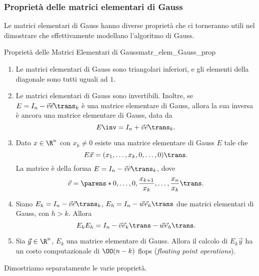 \subsubsection{Proprietà delle matrici elementari di Gauss} 
Le matrici elementari di Gauss hanno diverse proprietà che ci torneranno utili nel dimostrare che effettivamente modellano l'algoritmo di Gauss.

\begin{proposition}
    {Proprietà delle Matrici Elementari di Gauss}{matr_elem_Gauss_prop}
    \begin{enumerate}[(1)]
        \item Le matrici elementari di Gauss sono triangolari inferiori, e gli elementi della diagonale sono tutti uguali ad $1$.
        \item Le matrici elementari di Gauss sono invertibili. Inoltre, se $E = I_n - \vec v\vec{e}\trans_k$ è una matrice elementare di Gauss, allora la sua inversa è ancora una matrice elementare di Gauss, data da \[
            E\inv = I_n + \vec v\vec e\trans_k.
        \]
        \item Dato $x \in \R^n$ con $x_k \neq 0$ esiste una matrice elementare di Gauss $E$ tale che \[
            E\vec x = (x_1, \dots, x_k, 0, \dots, 0)\trans.
        \] La matrice è della forma $E = I_n - \vec v\vec e\trans_k$, dove \[
            \vec v = \parens*{0, \dots, 0, \frac{x_{k+1}}{x_k}, \dots, \frac{x_n}{x_k}}\trans.
        \]
        \item Siano $E_k = I_n - \vec v\vec e\trans_k$, $E_h = I_n - \vec w\vec e_h\trans$ due matrici elementari di Gauss, con $h > k$. Allora \[
            E_kE_h = I_n - \vec v\vec e_k\trans - \vec w\vec e_h\trans.
        \]
        \item Sia $\vec y \in \R^n$, $E_k$ una matrice elementare di Gauss. Allora il calcolo di $E_k\vec y$ ha un costo computazionale di $\OO(n - k)$ flops (\emph{floating point operations}). 
    \end{enumerate}
\end{proposition}

Dimostriamo separatamente le varie proprietà.

